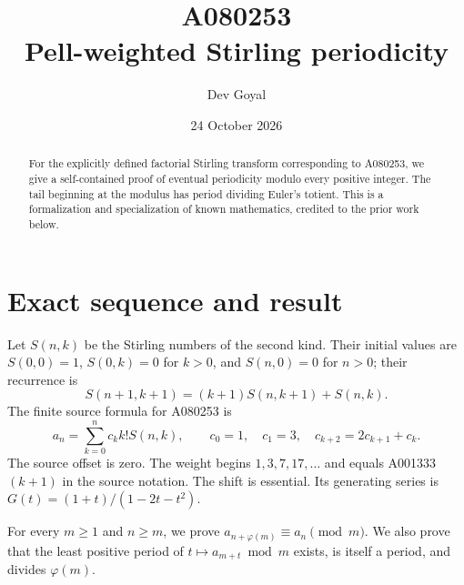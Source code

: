 \documentclass[11pt,a4paper]{article}
\title{A080253\\[3pt]Pell-weighted Stirling periodicity}
\author{Dev Goyal}
\date{24 October 2026}
\theoremstyle{remark}
\begin{document}
\maketitle
\begin{center}
\end{center}
\begin{abstract}
For the explicitly defined factorial Stirling transform corresponding to A080253, we give a self-contained proof of eventual periodicity modulo every positive integer. The tail beginning at the modulus has period dividing Euler's totient. This is a formalization and specialization of known mathematics, credited to the prior work below.
\end{abstract}
\section{Exact sequence and result}
Let $S(n,k)$ be the Stirling numbers of the second kind. Their initial
values are $S(0,0)=1$, $S(0,k)=0$ for $k>0$, and $S(n,0)=0$ for
$n>0$; their recurrence is
\[
S(n+1,k+1)=(k+1)S(n,k+1)+S(n,k).
\]
The finite source formula for A080253 \cite{oeis} is
\[
a_n=\sum_{k=0}^n c_k k!S(n,k),\qquad c_0=1,\quad c_1=3,\quad c_{k+2}=2c_{k+1}+c_k.
\]
The source offset is zero. The weight begins $1,3,7,17,\ldots$ and equals A001333$(k+1)$ in the source notation. The shift is essential. Its generating series is $G(t)=(1+t)/(1-2t-t^2)$.

For every $m\ge1$ and $n\ge m$, we prove
$a_{n+\varphi(m)}\equiv a_n\pmod m$. We also prove that the least
positive period of $t\mapsto a_{m+t}\bmod m$ exists, is itself a
period, and divides $\varphi(m)$.
\end{document}
